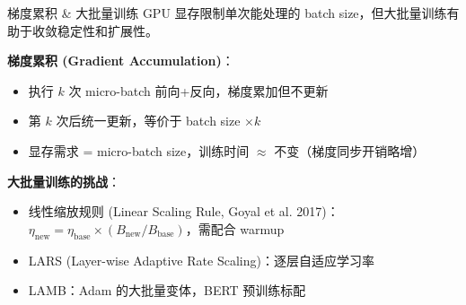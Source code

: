 \documentclass[11pt, aspectratio=169, svgnames, table, fontset=fandol]{ctexbeamer}
\begin{document}
\begin{frame}{梯度累积 \& 大批量训练}
  GPU 显存限制单次能处理的 batch size，但大批量训练有助于收敛稳定性和扩展性。

  \vspace{6pt}
  \textbf{梯度累积 (Gradient Accumulation)}：
  \begin{itemize}
    \item 执行 $k$ 次 micro-batch 前向+反向，梯度累加但不更新
    \item 第 $k$ 次后统一更新，等价于 batch size $\times k$
    \item 显存需求 = micro-batch size，训练时间 $\approx$ 不变（梯度同步开销略增）
  \end{itemize}

  \vspace{4pt}
  \textbf{大批量训练的挑战}：
  \begin{itemize}
    \item 线性缩放规则 (Linear Scaling Rule, Goyal et al. 2017)：\\
      $\eta_{\text{new}} = \eta_{\text{base}} \times (B_{\text{new}} / B_{\text{base}})$，需配合 warmup
    \item LARS (Layer-wise Adaptive Rate Scaling)：逐层自适应学习率
    \item LAMB：Adam 的大批量变体，BERT 预训练标配
  \end{itemize}
\end{frame}
\end{document}
